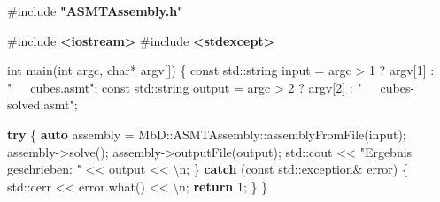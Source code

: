 \documentclass[
  12pt
]{book}
\newenvironment{Shaded}{}{}
\newcommand{\AttributeTok}[1]{\textcolor[rgb]{0.49,0.56,0.16}{#1}}
\newcommand{\BuiltInTok}[1]{\textcolor[rgb]{0.00,0.50,0.00}{#1}}
\newcommand{\CharTok}[1]{\textcolor[rgb]{0.25,0.44,0.63}{#1}}
\newcommand{\ControlFlowTok}[1]{\textcolor[rgb]{0.00,0.44,0.13}{\textbf{#1}}}
\newcommand{\DataTypeTok}[1]{\textcolor[rgb]{0.56,0.13,0.00}{#1}}
\newcommand{\DecValTok}[1]{\textcolor[rgb]{0.25,0.63,0.44}{#1}}
\newcommand{\ImportTok}[1]{\textcolor[rgb]{0.00,0.50,0.00}{\textbf{#1}}}
\newcommand{\KeywordTok}[1]{\textcolor[rgb]{0.00,0.44,0.13}{\textbf{#1}}}
\newcommand{\NormalTok}[1]{#1}
\newcommand{\OperatorTok}[1]{\textcolor[rgb]{0.40,0.40,0.40}{#1}}
\newcommand{\PreprocessorTok}[1]{\textcolor[rgb]{0.74,0.48,0.00}{#1}}
\newcommand{\SpecialCharTok}[1]{\textcolor[rgb]{0.25,0.44,0.63}{#1}}
\newcommand{\StringTok}[1]{\textcolor[rgb]{0.25,0.44,0.63}{#1}}
\begin{document}
\begin{Shaded}
\begin{Highlighting}[]
\PreprocessorTok{\#include }\ImportTok{"ASMTAssembly.h"}

\PreprocessorTok{\#include }\ImportTok{\textless{}iostream\textgreater{}}
\PreprocessorTok{\#include }\ImportTok{\textless{}stdexcept\textgreater{}}

\DataTypeTok{int}\NormalTok{ main}\OperatorTok{(}\DataTypeTok{int}\NormalTok{ argc}\OperatorTok{,} \DataTypeTok{char}\OperatorTok{*}\NormalTok{ argv}\OperatorTok{[])} \OperatorTok{\{}
    \AttributeTok{const} \BuiltInTok{std::}\NormalTok{string input }\OperatorTok{=}\NormalTok{ argc }\OperatorTok{\textgreater{}} \DecValTok{1} \OperatorTok{?}\NormalTok{ argv}\OperatorTok{[}\DecValTok{1}\OperatorTok{]} \OperatorTok{:} \StringTok{"\_\_cubes.asmt"}\OperatorTok{;}
    \AttributeTok{const} \BuiltInTok{std::}\NormalTok{string output }\OperatorTok{=}\NormalTok{ argc }\OperatorTok{\textgreater{}} \DecValTok{2} \OperatorTok{?}\NormalTok{ argv}\OperatorTok{[}\DecValTok{2}\OperatorTok{]} \OperatorTok{:} \StringTok{"\_\_cubes{-}solved.asmt"}\OperatorTok{;}

    \ControlFlowTok{try} \OperatorTok{\{}
        \KeywordTok{auto}\NormalTok{ assembly }\OperatorTok{=}\NormalTok{ MbD}\OperatorTok{::}\NormalTok{ASMTAssembly}\OperatorTok{::}\NormalTok{assemblyFromFile}\OperatorTok{(}\NormalTok{input}\OperatorTok{);}
\NormalTok{        assembly}\OperatorTok{{-}\textgreater{}}\NormalTok{solve}\OperatorTok{();}
\NormalTok{        assembly}\OperatorTok{{-}\textgreater{}}\NormalTok{outputFile}\OperatorTok{(}\NormalTok{output}\OperatorTok{);}
        \BuiltInTok{std::}\NormalTok{cout }\OperatorTok{\textless{}\textless{}} \StringTok{"Ergebnis geschrieben: "} \OperatorTok{\textless{}\textless{}}\NormalTok{ output }\OperatorTok{\textless{}\textless{}} \CharTok{\textquotesingle{}}\SpecialCharTok{\textbackslash{}n}\CharTok{\textquotesingle{}}\OperatorTok{;}
    \OperatorTok{\}} \ControlFlowTok{catch} \OperatorTok{(}\AttributeTok{const} \BuiltInTok{std::}\NormalTok{exception}\OperatorTok{\&}\NormalTok{ error}\OperatorTok{)} \OperatorTok{\{}
        \BuiltInTok{std::}\NormalTok{cerr }\OperatorTok{\textless{}\textless{}}\NormalTok{ error}\OperatorTok{.}\NormalTok{what}\OperatorTok{()} \OperatorTok{\textless{}\textless{}} \CharTok{\textquotesingle{}}\SpecialCharTok{\textbackslash{}n}\CharTok{\textquotesingle{}}\OperatorTok{;}
        \ControlFlowTok{return} \DecValTok{1}\OperatorTok{;}
    \OperatorTok{\}}
\OperatorTok{\}}
\end{Highlighting}
\end{Shaded}
\end{document}
